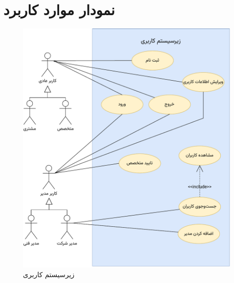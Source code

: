 \section{نمودار موارد کاربرد}


\begin{figure}[ht!]
\centering
		\includegraphics[scale=0.8, page=1]{figs/usecase.pdf}
\caption{زیرسیستم کاربری}
\end{figure}

\FloatBarrier
\newpage


